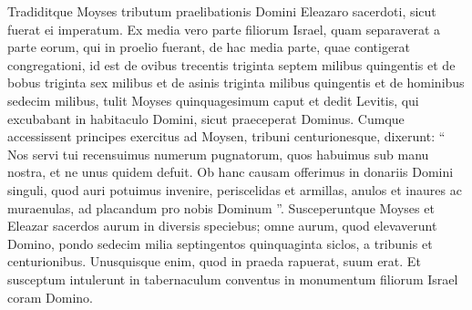 \begin{biblechapter}
\begin{biblechapter}
\begin{biblechapter}
\begin{biblechapter}
\begin{biblechapter}
\begin{biblechapter}
\begin{biblechapter}
\begin{biblechapter}
\begin{biblechapter}
\begin{biblechapter}
\begin{biblechapter}
\begin{biblechapter}
\begin{biblechapter}
\begin{biblechapter}
\begin{biblechapter}
\begin{biblechapter}
\begin{biblechapter}
\begin{biblechapter}
\begin{biblechapter}
\begin{biblechapter}
\begin{biblechapter}
\begin{biblechapter}
\begin{biblechapter}
\begin{biblechapter}
\begin{biblechapter}
\begin{biblechapter}
\begin{biblechapter}
\begin{biblechapter}
\begin{biblechapter}
\begin{biblechapter}
\begin{biblechapter}
\verse Tradiditque Moyses tributum praelibationis Domini Eleazaro sacerdoti, sicut fuerat ei imperatum. 
\verse Ex media vero parte filiorum Israel, quam separaverat a parte eorum, qui in proelio fuerant, 
\verse de hac media parte, quae contigerat congregationi, id est de ovibus trecentis triginta septem milibus quingentis 
\verse et de bobus triginta sex milibus 
\verse et de asinis triginta milibus quingentis 
\verse et de hominibus sedecim milibus, 
\verse tulit Moyses quinquagesimum caput et dedit Levitis, qui excubabant in habitaculo Domini, sicut praeceperat Dominus.
 \verse Cumque accessissent principes exercitus ad Moysen, tribuni centurionesque, dixerunt: 
\verse “ Nos servi tui recensuimus numerum pugnatorum, quos habuimus sub manu nostra, et ne unus quidem defuit. 
\verse Ob hanc causam offerimus in donariis Domini singuli, quod auri potuimus invenire, periscelidas et armillas, anulos et inaures ac muraenulas, ad placandum pro nobis Dominum ”. 
\verse Susceperuntque Moyses et Eleazar sacerdos aurum in diversis speciebus; 
\verse omne aurum, quod elevaverunt Domino, pondo sedecim milia septingentos quinquaginta siclos, a tribunis et centurionibus. 
\verse Unusquisque enim, quod in praeda rapuerat, suum erat. 
\verse Et susceptum intulerunt in tabernaculum conventus in monumentum filiorum Israel coram Domino.
 

\end{biblechapter}
\end{biblechapter}
\end{biblechapter}
\end{biblechapter}
\end{biblechapter}
\end{biblechapter}
\end{biblechapter}
\end{biblechapter}
\end{biblechapter}
\end{biblechapter}
\end{biblechapter}
\end{biblechapter}
\end{biblechapter}
\end{biblechapter}
\end{biblechapter}
\end{biblechapter}
\end{biblechapter}
\end{biblechapter}
\end{biblechapter}
\end{biblechapter}
\end{biblechapter}
\end{biblechapter}
\end{biblechapter}
\end{biblechapter}
\end{biblechapter}
\end{biblechapter}
\end{biblechapter}
\end{biblechapter}
\end{biblechapter}
\end{biblechapter}
\end{biblechapter}
